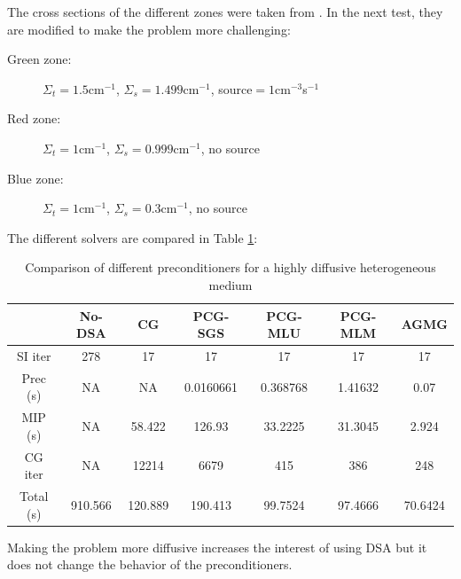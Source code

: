 The cross sections of the different zones were taken from \cite{mip}. In the
next test, they are modified to make the problem more challenging:
\begin{description}
  \item[Green zone:] $\Sigma_t =1.5$cm$^{-1}$, $\Sigma_s = 1.499$cm$^{-1}$, source$ =
    1$cm$^{-3}$s$^{-1}$
  \item[Red zone:] $\Sigma_t = 1$cm$^{-1}$, $\Sigma_s = 0.999$cm$^{-1}$, no source
  \item[Blue zone:] $\Sigma_t = 1$cm$^{-1}$, $\Sigma_s = 0.3$cm$^{-1}$, no source
\end{description}
The different solvers are compared in Table \ref{tab_5}:
\begin{table}[H]
  \begin{center}
    \caption{Comparison of different preconditioners for a highly diffusive 
    heterogeneous medium}
    \begin{tabular}{|c|c|c|c|c|c|c|}
      \hline
      & No-DSA & CG & PCG-SGS & PCG-MLU & PCG-MLM & AGMG\\
      \hline
      SI iter   & 278     & 17      & 17        & 17       & 17      & 17 \\
      Prec (s)  & NA      & NA      & 0.0160661 & 0.368768 & 1.41632 & 0.07 \\
      MIP (s)   & NA      & 58.422  & 126.93    & 33.2225  & 31.3045 & 2.924 \\
      CG iter   & NA      & 12214   & 6679      & 415      & 386     & 248 \\
      Total (s) & 910.566 & 120.889 & 190.413   & 99.7524  & 97.4666 & 70.6424 \\
      \hline
    \end{tabular}
    \label{tab_5}
  \end{center}
\end{table}
Making the problem more diffusive increases the interest of using DSA but it
does not change the behavior of the preconditioners.

